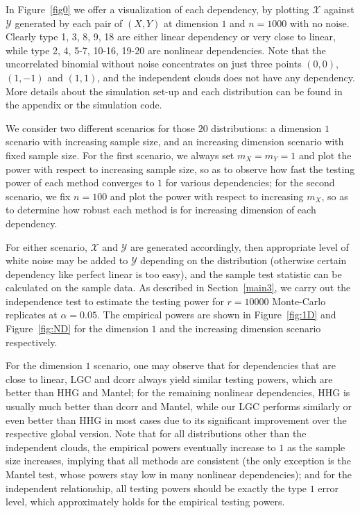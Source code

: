 \documentclass[11pt]{article}
\begin{document}
In Figure~\ref{fig0} we offer a visualization of each dependency, by plotting $\mathcal{X}$ against $\mathcal{Y}$ generated by each pair of $(X,Y)$ at dimension $1$ and $n=1000$ with no noise. Clearly type 1, 3, 8, 9, 18 are either linear dependency or very close to linear, while type 2, 4, 5-7, 10-16, 19-20 are nonlinear dependencies. Note that the uncorrelated binomial without noise concentrates on just three points $(0,0)$, $(1,-1)$ and $(1,1)$, and the independent clouds does not have any dependency. More details about the simulation set-up and each distribution can be found in the appendix or the simulation code.


We consider two different scenarios for those $20$ distributions: a dimension $1$ scenario with increasing sample size, and an increasing dimension scenario with fixed sample size. For the first scenario, we always set $m_{X}=m_{Y}=1$ and plot the power with respect to increasing sample size, so as to observe how fast the testing power of each method converges to $1$ for various dependencies; for the second scenario, we fix $n=100$ and plot the power with respect to increasing $m_{X}$, so as to determine how robust each method is for increasing dimension of each dependency. 

For either scenario, $\mathcal{X}$ and $\mathcal{Y}$ are generated accordingly, then appropriate level of white noise may be added to $\mathcal{Y}$ depending on the distribution (otherwise certain dependency like perfect linear is too easy), and the sample test statistic can be calculated on the sample data. As described in Section~\ref{main3}, we carry out the independence test to estimate the testing power for $r=10000$ Monte-Carlo replicates at $\alpha=0.05$. The empirical powers are shown in Figure~\ref{fig:1D} and Figure~\ref{fig:ND} for the dimension $1$ and the increasing dimension scenario respectively. 

For the dimension $1$ scenario, one may observe that for dependencies that are close to linear, LGC and dcorr always yield similar testing powers, which are better than HHG and Mantel; for the remaining nonlinear dependencies, HHG is usually much better than dcorr and Mantel, while our LGC performs similarly or even better than HHG in most cases due to its significant improvement over the respective global version. Note that for all distributions other than the independent clouds, the empirical powers eventually increase to $1$ as the sample size increases, implying that all methods are consistent (the only exception is the Mantel test, whose powers stay low in many nonlinear dependencies); and for the independent relationship, all testing powers should be exactly the type $1$ error level, which approximately holds for the empirical testing powers. 
\end{document}
